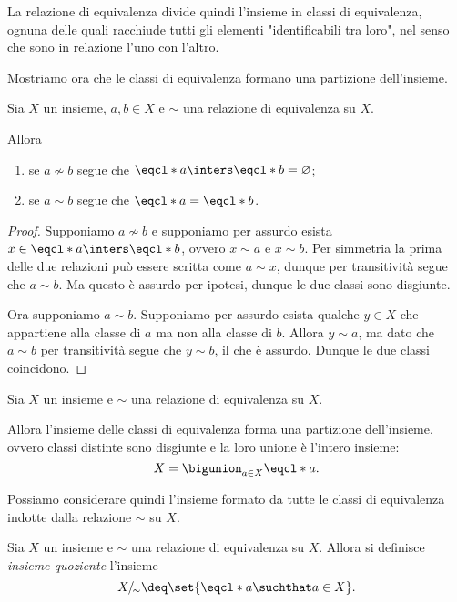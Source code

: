 La relazione di equivalenza divide quindi l'insieme in classi di equivalenza, ognuna delle quali racchiude tutti gli elementi "identificabili tra loro", nel senso che sono in relazione l'uno con l'altro.

Mostriamo ora che le classi di equivalenza formano una partizione dell'insieme.

\begin{lemma}
    Sia $X$ un insieme, $a, b \in X$ e $\sim$ una relazione di equivalenza su $X$.

    Allora \begin{enumerate}
        \item se $a \nsim b$ segue che $\eqcl*{a} \inters \eqcl*{b} = \varnothing$;
        \item se $a \sim b$ segue che $\eqcl*{a} = \eqcl*{b}$.
    \end{enumerate}
\end{lemma}
\begin{proof}
    Supponiamo $a \nsim b$ e supponiamo per assurdo esista $x \in \eqcl*{a} \inters \eqcl*{b}$, ovvero $x \sim a$ e $x \sim b$. Per simmetria la prima delle due relazioni può essere scritta come $a \sim x$, dunque per transitività segue che $a \sim b$. Ma questo è assurdo per ipotesi, dunque le due classi sono disgiunte.

    Ora supponiamo $a \sim b$. Supponiamo per assurdo esista qualche $y \in X$ che appartiene alla classe di $a$ ma non alla classe di $b$. Allora $y \sim a$, ma dato che $a \sim b$ per transitività segue che $y \sim b$, il che è assurdo. Dunque le due classi coincidono.
\end{proof}

\begin{theorem}
    Sia $X$ un insieme e $\sim$ una relazione di equivalenza su $X$.

    Allora l'insieme delle classi di equivalenza forma una partizione dell'insieme, ovvero classi distinte sono disgiunte e la loro unione è l'intero insieme: \[
        X = \bigunion_{a \in X} \eqcl*{a}.    
    \]
\end{theorem}

Possiamo considerare quindi l'insieme formato da tutte le classi di equivalenza indotte dalla relazione $\sim$ su $X$.

\begin{definition}
    Sia $X$ un insieme e $\sim$ una relazione di equivalenza su $X$. Allora si definisce \emph{insieme quoziente} l'insieme \begin{equation}
        X/_{\!\sim} \deq \set{\eqcl*{a} \suchthat a \in X}.
    \end{equation}
\end{definition}


